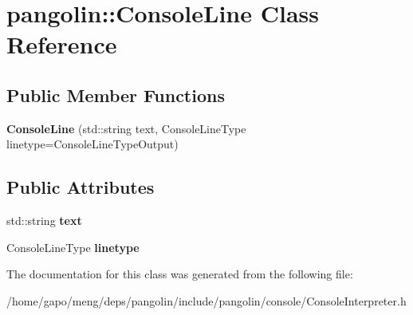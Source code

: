 \hypertarget{classpangolin_1_1_console_line}{}\section{pangolin\+:\+:Console\+Line Class Reference}
\label{classpangolin_1_1_console_line}
\subsection*{Public Member Functions}
\begin{DoxyCompactItemize}
\item 
{\bfseries Console\+Line} (std\+::string text, Console\+Line\+Type linetype=Console\+Line\+Type\+Output)\hypertarget{classpangolin_1_1_console_line_afb729b09fb44b866e430a02667874b27}{}\label{classpangolin_1_1_console_line_afb729b09fb44b866e430a02667874b27}

\end{DoxyCompactItemize}
\subsection*{Public Attributes}
\begin{DoxyCompactItemize}
\item 
std\+::string {\bfseries text}\hypertarget{classpangolin_1_1_console_line_a617b481c9c6e61c582b661900996338c}{}\label{classpangolin_1_1_console_line_a617b481c9c6e61c582b661900996338c}

\item 
Console\+Line\+Type {\bfseries linetype}\hypertarget{classpangolin_1_1_console_line_a17d9cd91ec915bf78eb56316fe736c4e}{}\label{classpangolin_1_1_console_line_a17d9cd91ec915bf78eb56316fe736c4e}

\end{DoxyCompactItemize}


The documentation for this class was generated from the following file\+:\begin{DoxyCompactItemize}
\item 
/home/gapo/meng/deps/pangolin/include/pangolin/console/Console\+Interpreter.\+h\end{DoxyCompactItemize}

